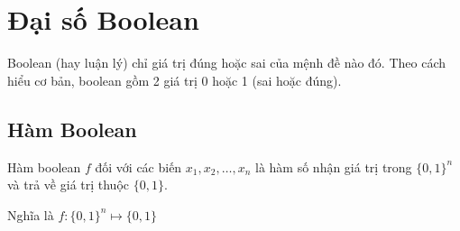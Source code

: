 \chapter{Đại số Boolean}

Boolean (hay luận lý) chỉ giá trị đúng hoặc sai của mệnh đề nào đó. 
Theo cách hiểu cơ bản, boolean gồm 2 giá trị 0 hoặc 1 (sai hoặc đúng).

\section{Hàm Boolean}

Hàm boolean $f$ đối với các biến $x_1, x_2, \ldots, x_n$ là hàm số nhận giá trị trong $\{0, 1\}^n$ và trả về giá trị thuộc $\{0, 1\}$.

Nghĩa là $f: \{0,1\}^n \mapsto \{0, 1\}$